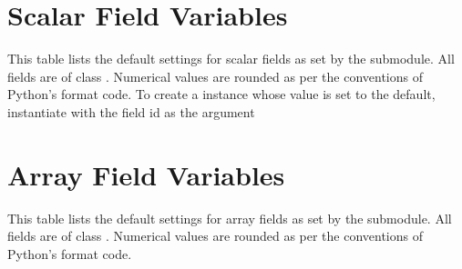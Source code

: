 %


%
\section{Scalar Field Variables}  \label{sec:defaults.scalar}

This table lists the default settings for scalar  fields
as set by the  submodule.  All fields are of class
.  Numerical values are rounded as per the conventions
of Python's  format code.
To create a  instance whose value is set to the
default, instantiate with the field id as the argument






\section{Array Field Variables}   \label{sec:defaults.array}

This table lists the default settings for array  fields
as set by the  submodule.  All fields are of class
.  Numerical values are rounded as per the conventions
of Python's  format code.







